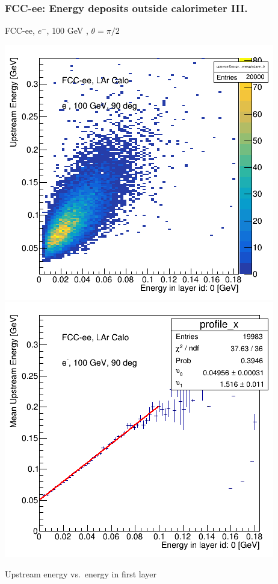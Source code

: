 \documentclass{beamer}
\newcommand{\redtext}[1]{%
  \textcolor{myRed}{#1}
}
\begin{document}
\begin{frame}
  \frametitle{FCC-ee: Energy deposits outside calorimeter III.}

  \centering
  FCC-ee, $e^{-}$, \redtext{100 GeV}, $\theta = \pi/2$ \\[1.5ex]
  \begin{adjustwidth}{-9mm}{-9mm}
    \includegraphics[width=0.49\linewidth]{figures/12layers/hist_upstream_vs_layer_0_90deg_100GeV.png}
    \includegraphics[width=0.49\linewidth]{figures/12layers/profile_upstream_vs_layer_0_90deg_100GeV.png}
  \end{adjustwidth}
  \redtext{Upstream} energy vs.\ energy in first layer
\end{frame}
\end{document}
